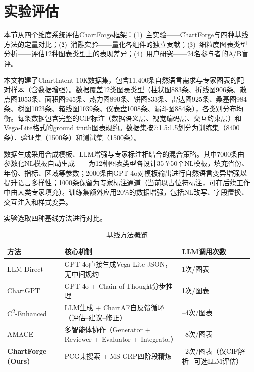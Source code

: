 \section{实验评估}
\label{sec:ch4_experiments}

本节从四个维度系统评估ChartForge框架：(1)~主实验——ChartForge与四种基线方法的定量对比；(2)~消融实验——量化各组件的独立贡献；(3)~细粒度图表类型分析——评估12种图表类型上的表现差异；(4)~用户研究——24名参与者的A/B盲评。


本文构建了ChartIntent-10K数据集，包含11,400条自然语言需求与专家图表的配对样本（含数据增强）。数据覆盖12类图表类型（柱状图883条、折线图906条、散点图1053条、面积图945条、热力图890条、饼图833条、雷达图925条、桑基图984条、树图1023条、箱线图1039条、仪表盘1008条、漏斗图884条），各类别分布均衡。每条数据包含完整的CIF标注（数据语义层、视觉编码层、交互约束层）和Vega-Lite格式的ground truth图表规约。数据集按7:1.5:1.5划分为训练集（8400条）、验证集（1500条）和测试集（1500条）。

数据生成采用合成模板、LLM增强与专家标注相结合的混合策略。其中7000条由参数化NL模板自动生成——为12种图表类型各设计35至50个NL模板，填充省份、年份、指标、区域等参数；2000条由GPT-4o对模板输出进行自然语言变异增强以提升语言多样性；1000条保留为专家标注通道（当前以占位符标注，可在后续工作中由人类专家填充）。训练集额外应用20\%的数据增强，包括NL改写、字段置换、交互注入和样式变异。

实验选取四种基线方法进行对比。

\begin{table}[H]
\centering
\caption{基线方法概览}
\label{tab:baselines}
\small
\begin{tabularx}{\linewidth}{l>{\raggedright\arraybackslash}X>{\raggedright\arraybackslash}p{2.6cm}}
\toprule
\textbf{方法} & \textbf{核心机制} & \textbf{LLM调用次数} \\
\midrule
LLM-Direct   & GPT-4o直接生成Vega-Lite JSON，无中间规约 & 1次/图表 \\
ChartGPT     & GPT-4o + Chain-of-Thought分步推理 & 1次/图表 \\
C\textsuperscript{2}-Enhanced & LLM生成 + ChartAF自反馈循环（评估--建议--修正） & 2--4次/图表 \\
AMACE        & 多智能体协作（Generator + Reviewer + Evaluator + Integrator） & 4--8次/图表 \\
\midrule
\textbf{ChartForge (Ours)} & PCG束搜索 + MS-GRP四阶段精炼 & 1--2次/图表（仅CIF解析+可选LLM评估） \\
\bottomrule
\end{tabularx}
\end{table}

